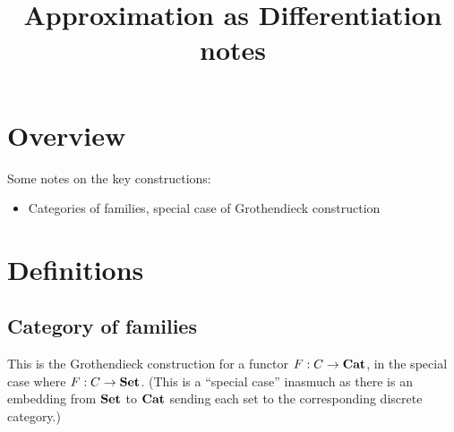 \documentclass{acmart}
\begin{document}
\title{Approximation as Differentiation notes}
\maketitle

\section{Overview}

Some notes on the key constructions:
\begin{itemize}
\item Categories of families, special case of Grothendieck construction
\end{itemize}

\section{Definitions}

\subsection{Category of families}

This is the Grothendieck construction for a functor $F: C \to \mathbf{Cat}$, in the special case where $F: C \to
\mathbf{Set}$. (This is a ``special case'' inasmuch as there is an embedding from $\mathbf{Set}$ to $\mathbf{Cat}$ sending each set to
the corresponding discrete category.)
\end{document}
